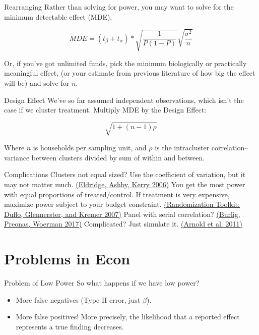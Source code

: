 \documentclass{beamer}
\begin{document}
\begin{frame}{Rearranging}
Rather than solving for power, you may want to solve for the minimum detectable effect (MDE). 

\[MDE = \left( t_{\beta} + t_{\alpha} \right)*\sqrt{\frac{1}{P(1 - P)}}\sqrt{\frac{\sigma^{2}}{n}}\]

Or, if you've got unlimited funds, pick the minimum biologically or practically meaningful effect, (or your estimate from previous literature of how big the effect will be) and solve for $n$.
\end{frame}

\begin{frame}{Design Effect}
We've so far assumed independent observations, which isn't the case if we cluster treatment. Multiply MDE by the Design Effect:

$$\sqrt{1+(n-1)\rho}$$

Where $n$ is households per sampling unit, and $\rho$ is the intracluster correlation--variance between clusters divided by sum of within and between.
\end{frame}

\begin{frame}{Complications}
Clusters not equal sized? Use the coefficient of variation, but it may not matter much. \href{https://doi.org/10.1093/ije/dyl129}{(Eldridge, Ashby, Kerry 2006)}
\vskip0.25in
You get the most power with equal proportions of treated/control. If treatment is very expensive, maximize power subject to your budget constraint. \href{http://www.sciencedirect.com/science/article/pii/S1573447107040612}{(Randomization Toolkit: Duflo, Glennerster, and Kremer 2007)}
\vskip0.25in
Panel with serial correlation? \href{https://static1.squarespace.com/static/558eff8ce4b023b6b855320a/t/59e932358dd041e0d712fff8/1508454965886/BPW\_Power\_Calculations\_2017\_10\_19.pdf}{(Burlig, Preonas, Woerman 2017)}
\vskip0.25in
Complicated? Just simulate it. \href{https://doi.org/10.1186/1471-2288-11-94}{(Arnold et al. 2011)}
\end{frame}

\section{Problems in Econ}
\begin{frame}{Problem of Low Power}
So what happens if we have low power?
\begin{itemize}
\item
More false negatives (Type II error, just $\beta$).
\item
More false positives! More precisely, the likelihood that a reported effect represents a true finding decreases.
\end{itemize}
\end{frame}
\end{document}
